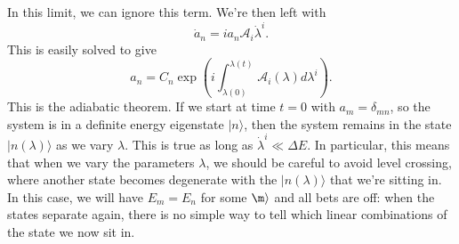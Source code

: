 In this limit, we can ignore this term. We're then left with
\[\dot{a}_n = ia_n\mathcal{A}_i \dot{\lambda}^i.\]
This is easily solved to give
\[a_n = C_n \exp \left(i \int_{\lambda(0)}^{\lambda(t)}  \mathcal{A}_i(\lambda) d\lambda^i \right).\]
This is the adiabatic theorem. If we start at time $t = 0$ with $a_m = \delta_{mn}$, so the system is in a definite energy eigenstate $|n\rangle$, then the system remains in the state $|n(\lambda)\rangle$ as we vary $\lambda$. 
This is true as long as $\dot{\lambda}^i \ll \Delta E$.
In particular, this means that when we vary the parameters $\lambda$, we should be careful to avoid level crossing, where another state becomes degenerate with the $|n(\lambda)\rangle$ that we're sitting in. 
In this case, we will have $E_m = E_n$ for some $\m\rangle$ and all bets are off: when the states separate again, there is no simple way to tell which linear combinations of the state we now sit in.

